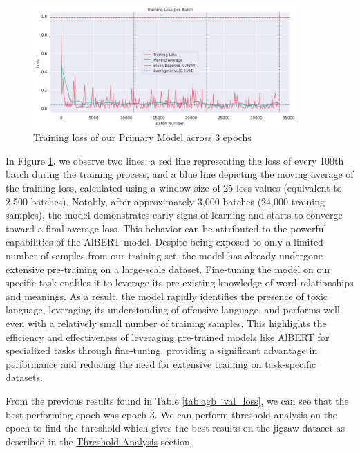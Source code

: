 \begin{figure}[H]
    \centering
    \includegraphics[width=0.9\textwidth]{graphs/training/accumulated_grad_batch/agb-10_training_loss.png}
    \caption{Training loss of our Primary Model across 3 epochs}
    \label{fig:agb_10_train}
\end{figure}

In Figure \ref{fig:agb_10_train}, we observe two lines: a red line representing the loss of every 100th batch during the training process, and a blue line depicting the moving average of the training loss, calculated using a window size of 25 loss values (equivalent to 2,500 batches). Notably, after approximately 3,000 batches (24,000 training samples), the model demonstrates early signs of learning and starts to converge toward a final average loss. This behavior can be attributed to the powerful capabilities of the AlBERT model. Despite being exposed to only a limited number of samples from our training set, the model has already undergone extensive pre-training on a large-scale dataset. Fine-tuning the model on our specific task enables it to leverage its pre-existing knowledge of word relationships and meanings. As a result, the model rapidly identifies the presence of toxic language, leveraging its understanding of offensive language, and performs well even with a relatively small number of training samples. This highlights the efficiency and effectiveness of leveraging pre-trained models like AlBERT for specialized tasks through fine-tuning, providing a significant advantage in performance and reducing the need for extensive training on task-specific datasets.

From the previous results found in Table \ref{tab:agb_val_loss}, we can see that the best-performing epoch was epoch 3. We can perform threshold analysis on the epoch to find the threshold which gives the best results on the jigsaw dataset as described in the \hyperref[threshold]{Threshold Analysis} section.

